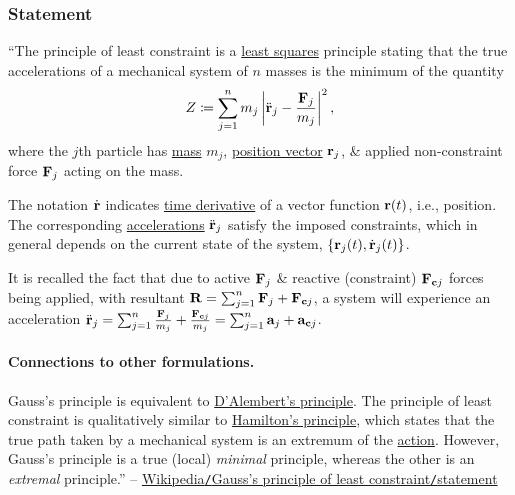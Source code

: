 \documentclass{article}
\begin{document}
\subsubsection{Statement}
``The principle of least constraint is a \href{https://en.wikipedia.org/wiki/Least_squares}{least squares} principle stating that the true accelerations of a mechanical system of $n$ masses is the minimum of the quantity
\begin{align*}
	Z\coloneqq\sum_{j=1}^n m_j\left|\ddot{\bf r}_j - \frac{{\bf F}_j}{m_j}\right|^2,
\end{align*}
where the $j$th particle has \href{https://en.wikipedia.org/wiki/Mass}{mass} $m_j$, \href{https://en.wikipedia.org/wiki/Position_vector}{position vector} ${\bf r}_j$, \& applied non-constraint force ${\bf F}_j$ acting on the mass.

The notation $\dot{\bf r}$ indicates \href{https://en.wikipedia.org/wiki/Time_derivative}{time derivative} of a vector function ${\bf r}(t)$, i.e., position. The corresponding \href{https://en.wikipedia.org/wiki/Acceleration}{accelerations} $\ddot{\bf r}_j$ satisfy the imposed constraints, which in general depends on the current state of the system, $\{{\bf r}_j(t),\dot{\bf r}_j(t)\}$.

It is recalled the fact that due to active ${\bf F}_j$ \& reactive (constraint) ${\bf F}_{{\bf c}j}$ forces being applied, with resultant ${\bf R} = \sum_{j=1}^n {\bf F}_j + {\bf F}_{{\bf c}j}$, a system will experience an acceleration $\ddot{\bf r}_j = \sum_{j=1}^n \frac{{\bf F}_j}{m_j} + \frac{{\bf F}_{{\bf c}j}}{m_j} = \sum_{j=1}^n {\bf a}_j + {\bf a}_{{\bf c}j}$.

\paragraph{Connections to other formulations.} Gauss's principle is equivalent to \href{https://en.wikipedia.org/wiki/D%27Alembert%27s_principle}{D'Alembert's principle}. The principle of least constraint is qualitatively similar to \href{https://en.wikipedia.org/wiki/Hamilton%27s_principle}{Hamilton's principle}, which states that the true path taken by a mechanical system is an extremum of the \href{https://en.wikipedia.org/wiki/Action_(physics)}{action}. However, Gauss's principle is a true (local) \textit{minimal} principle, whereas the other is an \textit{extremal} principle.'' -- \href{https://en.wikipedia.org/wiki/Gauss%27s_principle_of_least_constraint#Statement}{Wikipedia{\tt/}Gauss's principle of least constraint{\tt/}statement}
\end{document}
